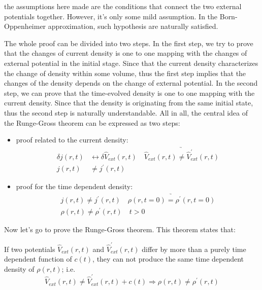 the assumptions here made are the conditions that connect the two
external potentials together. However, it's only some mild
assumption. In the Born-Oppenheimer approximation, such hypothesis
are naturally satisfied.

The whole proof can be divided into two steps. In the first step, we
try to prove that the changes of current density is one to one
mapping with the changes of external potential in the initial stage.
Since that the current density characterizes the change of density
within some volume, thus the first step implies that the changes of
the density depends on the change of external potential. In the
second step, we can prove that the time-evolved density is one to
one mapping with the current density. Since that the density is
originating from the same initial state, thus the second step is
naturally understandable. All in all, the central idea of the
Runge-Gross theorem can be expressed as two steps:
\begin{itemize}
  \item proof related to the current density:
  \begin{align}\label{}
  \delta j(r,t) &\leftrightarrow \delta\hat{V}_{ext}(r,t) \quad
  \underrightarrow{\hat{V}_{ext}(r,t) \neq \hat{V}^{'}_{ext}(r,t)}
  \nonumber \\
  j(r,t) &\neq j^{'}(r,t)
  \end{align}
  \item proof for the time dependent density:
  \begin{multline}\label{}
  j(r,t) \neq j^{'}(r,t) \quad \underrightarrow{\rho(r, t=0) = 
\rho^{'}(r,
  t=0)} \\
  \rho(r,t) \neq \rho^{'}(r,t) \quad t > 0
  \end{multline}
\end{itemize}

Now let's go to prove the Runge-Gross theorem. This theorem states
that:
\begin{theorem}
If two potentials $\hat{V}_{ext}(r,t)$ and $\hat{V}^{'}_{ext}(r,t)$
differ by more than a purely time dependent function of $c(t)$, they
can not produce the same time dependent density of $\rho(r,t)$; i.e.
\begin{equation}\label{}
\hat{V}_{ext}(r,t) \neq \hat{V}^{'}_{ext}(r,t) + c(t) \Rightarrow
\rho(r,t) \neq \rho^{'}(r,t)
\end{equation}
\end{theorem}

